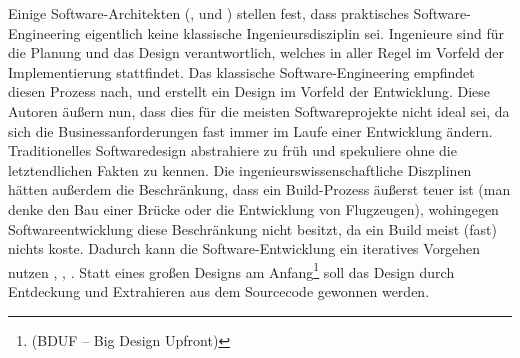 



Einige Software-Architekten (\citeauthor*{neal_ford_emergent_2010}, \citeauthor*{jack_reeves_three_1992} und \citeauthor{glenn_vanderburg_real_2010}) stellen fest, dass praktisches Software-Engineering eigentlich keine klassische Ingenieursdisziplin sei. Ingenieure sind für die Planung und das Design verantwortlich, welches in aller Regel im Vorfeld der Implementierung stattfindet. Das klassische Software-Engineering empfindet diesen Prozess nach, und erstellt ein Design im Vorfeld der Entwicklung. Diese Autoren äußern nun, dass dies für die meisten Softwareprojekte nicht ideal sei, da sich die Businessanforderungen fast immer im Laufe einer Entwicklung ändern. Traditionelles Softwaredesign abstrahiere zu früh und spekuliere ohne die letztendlichen Fakten zu kennen. Die ingenieurswissenschaftliche Diszplinen hätten außerdem die Beschränkung, dass ein Build-Prozess äußerst teuer ist (man denke den Bau einer Brücke oder die Entwicklung von Flugzeugen), wohingegen Softwareentwicklung diese Beschränkung nicht besitzt, da ein Build meist (fast) nichts koste. Dadurch kann die Software-Entwicklung ein iteratives Vorgehen nutzen \citep{neal_ford_emergent_2010}, \citep{glenn_vanderburg_real_2010}, \citep{jack_reeves_three_1992}. Statt eines großen Designs am Anfang\footnote{(BDUF -- Big Design Upfront)} soll das Design durch Entdeckung und Extrahieren aus dem Sourcecode gewonnen werden.

